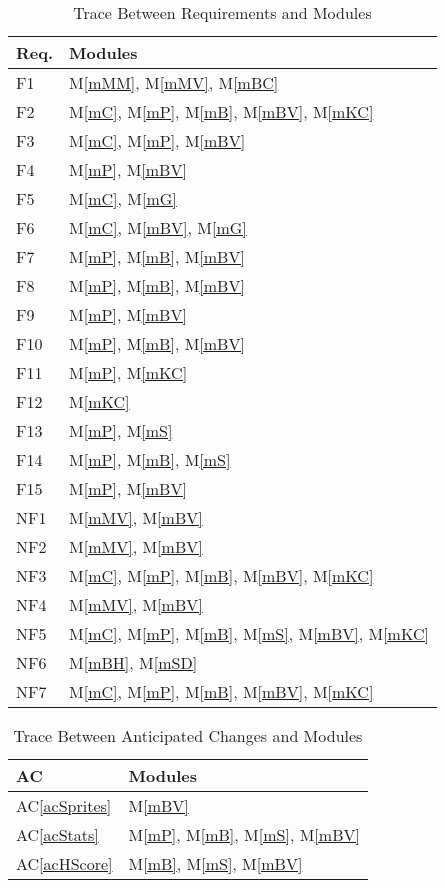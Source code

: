 \documentclass[12pt, titlepage]{article}
\newcommand{\acref}[1]{AC\ref{#1}}
\newcommand{\mref}[1]{M\ref{#1}}
\begin{document}
\begin{table}[H]
\centering
\begin{tabular}{p{} p{}}
\toprule
\textbf{Req.} & \textbf{Modules}\\
\midrule
F1 & \mref{mMM}, \mref{mMV}, \mref{mBC}\\
F2 & \mref{mC}, \mref{mP}, \mref{mB}, \mref{mBV}, \mref{mKC}\\
F3 & \mref{mC}, \mref{mP}, \mref{mBV}\\
F4 & \mref{mP}, \mref{mBV}\\
F5 & \mref{mC}, \mref{mG}\\
F6 & \mref{mC}, \mref{mBV}, \mref{mG}\\
F7 & \mref{mP}, \mref{mB}, \mref{mBV}\\
F8 & \mref{mP}, \mref{mB}, \mref{mBV}\\
F9 & \mref{mP}, \mref{mBV}\\
F10 & \mref{mP}, \mref{mB}, \mref{mBV}\\
F11 & \mref{mP}, \mref{mKC}\\
F12 & \mref{mKC}\\
F13 & \mref{mP}, \mref{mS}\\
F14 & \mref{mP}, \mref{mB}, \mref{mS}\\
F15 & \mref{mP}, \mref{mBV}\\
NF1 & \mref{mMV}, \mref{mBV}\\
NF2 & \mref{mMV}, \mref{mBV}\\
NF3 & \mref{mC}, \mref{mP}, \mref{mB}, \mref{mBV}, \mref{mKC}\\
NF4 & \mref{mMV}, \mref{mBV}\\
NF5 & \mref{mC}, \mref{mP}, \mref{mB}, \mref{mS}, \mref{mBV}, \mref{mKC}\\
NF6 & \mref{mBH}, \mref{mSD}\\
NF7 & \mref{mC}, \mref{mP}, \mref{mB}, \mref{mBV}, \mref{mKC}\\
\bottomrule
\end{tabular}
\caption{Trace Between Requirements and Modules}
\label{TblRT}
\end{table}

\begin{table}[H]
\centering
\begin{tabular}{p{} p{}}
\toprule
\textbf{AC} & \textbf{Modules}\\
\midrule
\acref{acSprites} & \mref{mBV}\\
\acref{acStats} & \mref{mP}, \mref{mB}, \mref{mS}, \mref{mBV}\\
\acref{acHScore} & \mref{mB}, \mref{mS}, \mref{mBV}\\
\bottomrule
\end{tabular}
\caption{Trace Between Anticipated Changes and Modules}
\label{TblACT}
\end{table}
\end{document}
